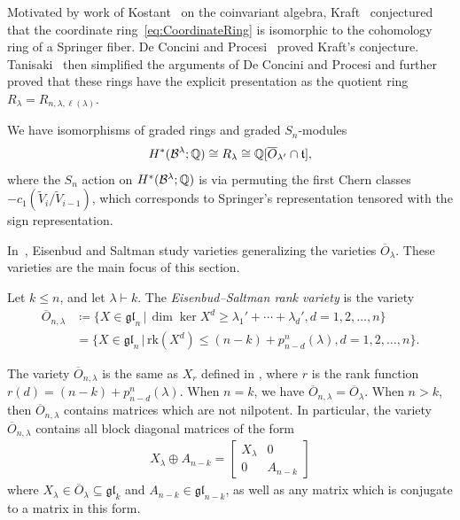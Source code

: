 \documentclass[12pt]{amsart}
\newcommand{\st}{\,|\,}
\newcommand{\la}{\lambda}
\newcommand{\fgl}{\mathfrak{gl}}
\newcommand{\ft}{\mathfrak{t}}
\newcommand{\rk}{\mathrm{rk}}
\begin{document}
Motivated by work of Kostant~\cite{Kostant} on the coinvariant algebra, Kraft~\cite{Kraft} conjectured that the coordinate ring~\eqref{eq:CoordinateRing} is isomorphic to the cohomology ring of a Springer fiber. De Concini and Procesi~\cite{dCP} proved Kraft's conjecture. Tanisaki~\cite{Tanisaki} then simplified the arguments of De Concini and Procesi and further proved that these rings have the explicit presentation as the quotient ring $R_{\la} = R_{n, \la, \ell(\la)}$.



\begin{theorem}
We have isomorphisms of graded rings and graded $S_n$-modules
\begin{align}
H^*(\mathcal{B}^\lambda;\bQ) \cong R_\la \cong \bQ[\overline{O}_{\la'}\cap \ft],
\end{align}
where the $S_n$ action on $H^*(\mathcal{B}^\lambda;\mathbb{Q})$ is via permuting the first Chern classes $-c_1(\widetilde V_i/\widetilde V_{i-1})$, which corresponds to Springer's representation tensored with the sign representation.
\end{theorem}

In~\cite{Eisenbud-Saltman}, Eisenbud and Saltman study varieties generalizing the varieties $\overline{O}_{\la}$. These varieties are the main focus of this section.

\begin{definition}
Let $k\leq n$, and let $\la\vdash k$. The \emph{Eisenbud--Saltman rank variety} is the variety
\begin{align}
\overline{O}_{n,\la} &\coloneqq \{ X\in \fgl_n\st \dim\ker X^d \geq \la_1' + \cdots +\la_d', d=1,2,\dots, n\}\\
&= \{X\in \fgl_n \st \rk(X^d)\leq (n-k)+p_{n-d}^n(\la), d=1,2,\dots, n\}.
\end{align}
\end{definition}
The variety $\overline{O}_{n,\la}$ is the same as $X_r$ defined in \cite{Eisenbud-Saltman}, where $r$ is the rank function $r(d) = (n-k)+p_{n-d}^n(\la)$. When $n=k$, we have $\overline{O}_{n,\la} = \overline{O}_\la$. When $n>k$, then $\overline{O}_{n,\la}$ contains matrices which are not nilpotent.  In particular, the variety $\overline{O}_{n,\la}$ contains all block diagonal matrices of the form
\begin{align}\label{eq:JordanForm}
X_\la \oplus A_{n-k} = \left[\begin{array}{c|c} X_{\la} & 0 \\ \hline 0 & A_{n-k}\end{array} \right]
\end{align}
where $X_\la\in \overline{O}_\la\subseteq \fgl_k$ and $A_{n-k}\in \fgl_{n-k}$, as well as any matrix which is conjugate to a matrix in this form.
\end{document}
